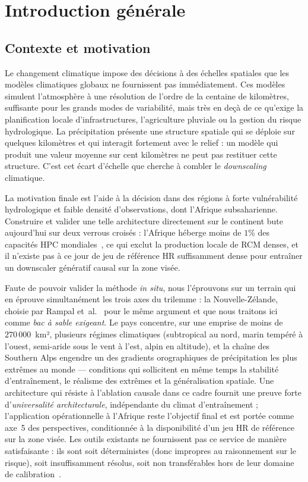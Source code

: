 \documentclass[14pt,a4paper,openany]{extreport}
\begin{document}
\chapter*{Introduction générale}

\section*{Contexte et motivation}

Le changement climatique impose des décisions à des échelles spatiales que les modèles climatiques globaux ne fournissent pas immédiatement. Ces modèles simulent l'atmosphère à une résolution de l'ordre de la centaine de kilomètres, suffisante pour les grands modes de variabilité, mais très en deçà de ce qu'exige la planification locale d'infrastructures, l'agriculture pluviale ou la gestion du risque hydrologique. La précipitation présente une structure spatiale qui se déploie sur quelques kilomètres et qui interagit fortement avec le relief : un modèle qui produit une valeur moyenne sur cent kilomètres ne peut pas restituer cette structure. C'est cet écart d'échelle que cherche à combler le \emph{downscaling} climatique.

La motivation finale est l'aide à la décision dans des régions à forte vulnérabilité hydrologique et faible densité d'observations, dont l'Afrique subsaharienne. Construire et valider une telle architecture directement sur le continent bute aujourd'hui sur deux verrous croisés : l'Afrique héberge moins de $1\%$ des capacités HPC mondiales~\cite{bachmann_hpc_africa_2025}, ce qui exclut la production locale de RCM denses, et il n'existe pas à ce jour de jeu de référence HR suffisamment dense pour entraîner un downscaler génératif causal sur la zone visée.

Faute de pouvoir valider la méthode \emph{in situ}, nous l'éprouvons sur un terrain qui en éprouve simultanément les trois axes du trilemme : la Nouvelle-Zélande, choisie par Rampal et~al.~\cite{rampal_cgan_2024} pour le même argument et que nous traitons ici comme \emph{bac à sable exigeant}. Le pays concentre, sur une emprise de moins de $270\,000$~km², plusieurs régimes climatiques (subtropical au nord, marin tempéré à l'ouest, semi-aride sous le vent à l'est, alpin en altitude), et la chaîne des Southern Alps engendre un des gradients orographiques de précipitation les plus extrêmes au monde --- conditions qui sollicitent en même temps la stabilité d'entraînement, le réalisme des extrêmes et la généralisation spatiale. Une architecture qui résiste à l'ablation causale dans ce cadre fournit une preuve forte d'\emph{universalité architecturale}, indépendante du climat d'entraînement ; l'application opérationnelle à l'Afrique reste l'objectif final et est portée comme axe~5 des perspectives, conditionnée à la disponibilité d'un jeu HR de référence sur la zone visée. Les outils existants ne fournissent pas ce service de manière satisfaisante : ils sont soit déterministes (donc impropres au raisonnement sur le risque), soit insuffisamment résolus, soit non transférables hors de leur domaine de calibration~\cite{maraun_widmann_2018}.
\end{document}
